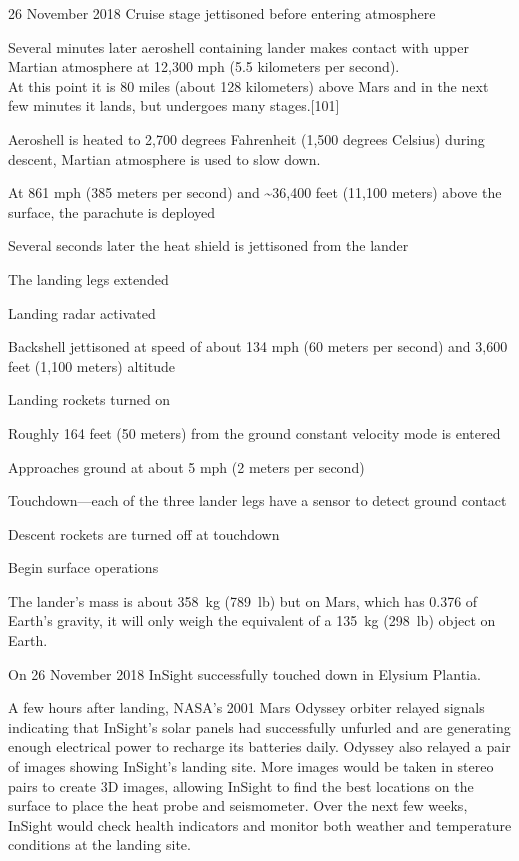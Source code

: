 26 November 2018 Cruise stage jettisoned before entering atmosphere

Several minutes later aeroshell containing lander makes contact with
upper Martian atmosphere at 12,300 mph (5.5 kilometers per second).\\
At this point it is 80 miles (about 128 kilometers) above Mars and in
the next few minutes it lands, but undergoes many stages.{[}101{]}

Aeroshell is heated to 2,700 degrees Fahrenheit (1,500 degrees Celsius)
during descent, Martian atmosphere is used to slow down.

At 861 mph (385 meters per second) and \textasciitilde{}36,400 feet
(11,100 meters) above the surface, the parachute is deployed

Several seconds later the heat shield is jettisoned from the lander

The landing legs extended

Landing radar activated

Backshell jettisoned at speed of about 134 mph (60 meters per second)
and 3,600 feet (1,100 meters) altitude

Landing rockets turned on

Roughly 164 feet (50 meters) from the ground constant velocity mode is
entered

Approaches ground at about 5 mph (2 meters per second)

Touchdown---each of the three lander legs have a sensor to detect ground
contact

Descent rockets are turned off at touchdown

Begin surface operations

The lander's mass is about 358~kg (789~lb) but on Mars, which has 0.376
of Earth's gravity, it will only weigh the equivalent of a 135~kg
(298~lb) object on Earth.

On 26 November 2018 InSight successfully touched down in Elysium
Plantia.

A few hours after landing, NASA's 2001 Mars Odyssey orbiter relayed
signals indicating that InSight's solar panels had successfully unfurled
and are generating enough electrical power to recharge its batteries
daily. Odyssey also relayed a pair of images showing InSight's landing
site. More images would be taken in stereo pairs to create 3D images,
allowing InSight to find the best locations on the surface to place the
heat probe and seismometer. Over the next few weeks, InSight would check
health indicators and monitor both weather and temperature conditions at
the landing site.

